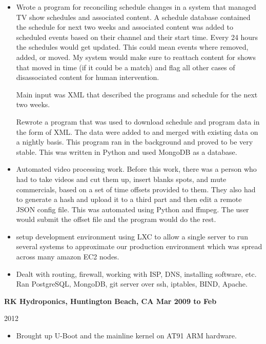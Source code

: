 \documentclass{res}
\begin{document}
\begin{resume}
\begin{itemize}
\item
Wrote a program for reconciling schedule changes in a system that managed
TV show schedules and associated content.  A schedule database
contained the schedule for next two weeks and associated content was
added to scheduled events based on their channel and their start time.
Every 24 hours the schedules would get updated.  This could mean events
where removed, added, or moved.  My system would make sure to reattach
content for shows that moved in time (if it could be a match) and flag
all other cases of disassociated content for human intervention.



Main input was XML that
described the programs and schedule for the next two weeks.  


Rewrote a program that was used to download schedule and program
data in the form of XML.  The data were added to and merged with existing
data on a nightly basis.  This program ran in the background and proved
to be very stable.  This was written in Python and used MongoDB as
a database.

\item Automated video processing work.  Before this work, there was a
person who had to take videos and cut them up, insert blanks spots, and
mute commercials, based on a set of time offsets provided to them.  They
also had to generate a hash and upload it to a third part and then edit
a remote JSON config file.  This was automated using Python and ffmpeg.
The user would submit the offset file and the program would do the rest.

\item setup  development  environment using LXC to allow a single server
to run several systems to approximate our production environment which
was spread across many amazon EC2 nodes.

\item Dealt with routing, firewall, working with ISP, DNS,
installing software, etc.  Ran PostgreSQL, MongoDB, git server
over ssh, iptables, BIND, Apache. 

\end{itemize}


{\large \bf RK Hydroponics, Huntington Beach, CA \hfill Mar 2009 to Feb

2012} \begin{itemize}

\item Brought up U-Boot and the mainline kernel on AT91 ARM hardware.


\end{itemize}
\end{resume}
\end{document}
